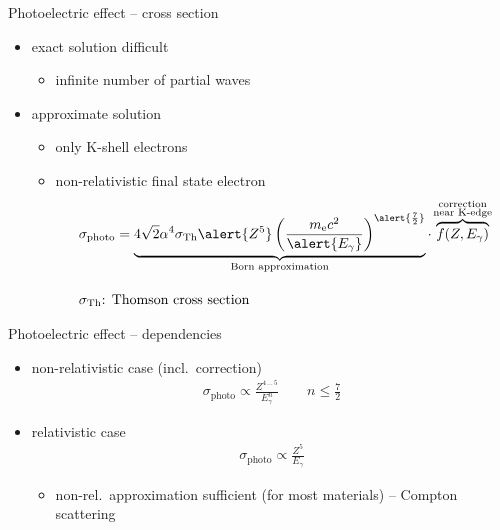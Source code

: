 \documentclass[11pt,xcolor=dvipsnames,professionalfonts]{beamer}
\begin{document}
\begin{frame}{Photoelectric effect -- cross section}
	\begin{itemize}
		\setlength\itemsep{1.5em}
		\item exact solution difficult
		\begin{itemize}
			\item infinite number of partial waves
		\end{itemize}
		\item approximate solution
		\begin{itemize}
			\item only K-shell electrons
			\item non-relativistic final state electron			
			\begin{align*}
				&\sigma_\mathrm{photo} = \underbrace{4\sqrt{2} \alpha^4 \sigma_\mathrm{Th} \alert{Z^5}  \left( \frac{m_\mathrm{e}c^2}{\alert{E_\gamma}} \right)^{\alert{\frac{7}{2}}}}_{\text{Born approximation}} \cdot \, \overbrace{f(Z, E_\gamma)}^{\mathclap{\substack{\text{correction}\\\text{near K-edge}}}} \\[1em]
				&\sigma_\mathrm{Th}\text{: Thomson cross section}
			\end{align*}
		\end{itemize}
	\end{itemize}
\end{frame}


\begin{frame}{Photoelectric effect -- dependencies}
	\begin{itemize}
		\setlength\itemsep{1.5em}
		\item non-relativistic case (incl.\ correction)
		\begin{align*}
		\sigma_\mathrm{photo} \propto  \frac{Z^{4 \, \dots \, 5}}{E_\gamma^{n}} \qquad n \leq \frac{7}{2}
		\end{align*}
		
		\item relativistic case
		\begin{align*}
			\sigma_\mathrm{photo} \propto \frac{Z^5}{E_\gamma}
		\end{align*}
		\begin{itemize}
			\item non-rel.\ approximation sufficient (for most materials) -- Compton scattering
		\end{itemize} 
	\end{itemize}
\end{frame}
\end{document}
